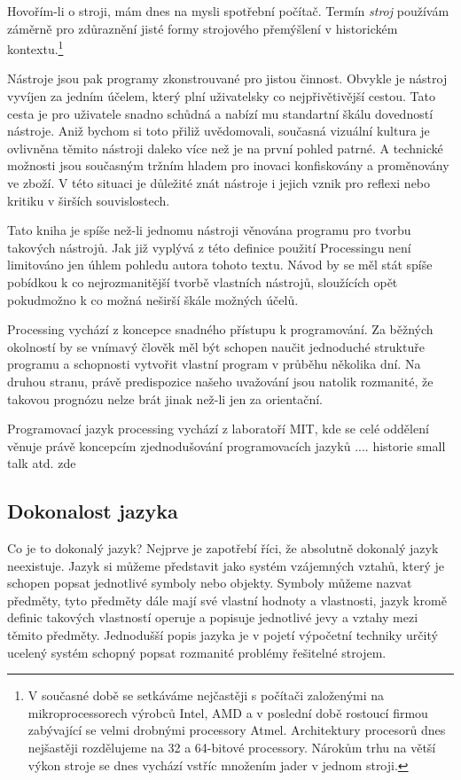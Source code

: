 \documentclass[11pt]{article}
\begin{document}
Hovořím-li o stroji, mám dnes na mysli spotřební počítač. Termín {\em stroj} používám záměrně pro zdůraznění jisté formy strojového přemýšlení v historickém kontextu.\footnote{V současné době se setkáváme nejčastěji s počítači založenými na mikroprocessorech výrobců Intel, AMD a v poslední době rostoucí firmou zabývající se velmi drobnými processory Atmel. Architektury procesorů dnes nejšastěji rozdělujeme na 32 a 64-bitové processory. Nárokům trhu na větší výkon stroje se dnes vychází vstříc množením jader v jednom stroji.}

Nástroje jsou pak programy zkonstrouvané pro jistou činnost. Obvykle je nástroj vyvíjen za jedním účelem, který plní uživatelsky co nejpřivětivější cestou. Tato cesta je pro uživatele snadno schůdná a nabízí mu standartní škálu dovedností nástroje. Aniž bychom si toto přiliž uvědomovali, současná vizuální kultura je ovlivněna těmito nástroji daleko více než je na první pohled patrné. A technické možnosti jsou současným tržním hladem pro inovaci konfiskovány a proměnovány ve zboží. V této situaci je důležité znát nástroje i jejich vznik pro reflexi nebo kritiku v širších souvislostech.

Tato kniha je spíše než-li jednomu nástroji věnována programu pro tvorbu takových nástrojů. Jak již vyplývá z této definice použití Processingu není limitováno jen úhlem pohledu autora tohoto textu. Návod by se měl stát spíše pobídkou k co nejrozmanitější tvorbě vlastních nástrojů, sloužících opět pokudmožno k co možná neširší škále možných účelů.

Processing vychází z koncepce snadného přístupu k programování. Za běžných okolností by se vnímavý člověk měl být schopen naučit jednoduché struktuře programu a schopnosti vytvořit vlastní program v průběhu několika dní. Na druhou stranu, právě predispozice našeho uvažování jsou natolik rozmanité, že takovou prognózu nelze brát jinak než-li jen za orientační.


Programovací jazyk processing vychází z laboratoří MIT, kde se celé oddělení věnuje právě koncepcím zjednodušování programovacích jazyků .... historie small talk atd. zde


\subsection{Dokonalost jazyka}

Co je to dokonalý jazyk? Nejprve je zapotřebí říci, že absolutně dokonalý jazyk neexistuje. Jazyk si můžeme představit jako systém vzájemných vztahů, který je schopen popsat jednotlivé symboly nebo objekty. Symboly můžeme nazvat předměty, tyto předměty dále mají své vlastní hodnoty a vlastnosti, jazyk kromě definic takových vlastností operuje a popisuje jednotlivé jevy a vztahy mezi těmito předměty. Jednodušší popis jazyka je v pojetí výpočetní techniky určitý ucelený systém schopný popsat rozmanité problémy řešitelné strojem.
\end{document}
